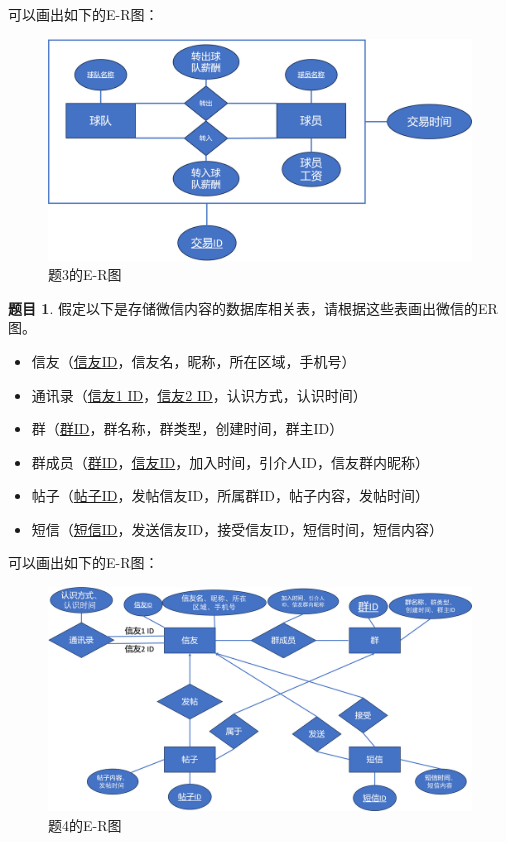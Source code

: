\documentclass[12pt]{article} %
\makeatletter
\theoremstyle{definition}
\newtheorem{problem}{题目}
\newenvironment{proof}[1][\protect\proofname]{\par
\normalfont\topsep6\p@\@plus6\p@\relax
\trivlist
\itemindent\parindent
\item[\hskip\labelsep
\scshape
#1]\ignorespaces
}{%
\endtrivlist\@endpefalse
}
\renewcommand{\proofname}{\it{解答}}
\makeatother
\begin{document}
\begin{proof}
可以画出如下的E-R图：
\begin{figure}[H]
  \centering
  \includegraphics[width=1\textwidth]{./figs/3.1.png}
  \caption{题3的E-R图}
\end{figure}
\end{proof}

\begin{problem}
假定以下是存储微信内容的数据库相关表，请根据这些表画出微信的ER图。
\begin{itemize}
  \item 信友（\uline{信友ID}，信友名，昵称，所在区域，手机号）
  \item 通讯录（\uline{信友1 ID}，\uline{信友2 ID}，认识方式，认识时间）
  \item 群（\uline{群ID}，群名称，群类型，创建时间，群主ID）
  \item 群成员（\uline{群ID}，\uline{信友ID}，加入时间，引介人ID，信友群内昵称）
  \item 帖子（\uline{帖子ID}，发帖信友ID，所属群ID，帖子内容，发帖时间）
  \item 短信（\uline{短信ID}，发送信友ID，接受信友ID，短信时间，短信内容）
\end{itemize}
\end{problem}

\begin{proof}
可以画出如下的E-R图：
\begin{figure}[H]
  \centering
  \includegraphics[width=1\textwidth]{./figs/4.png}
  \caption{题4的E-R图}
\end{figure}
\end{proof}
\end{document}
